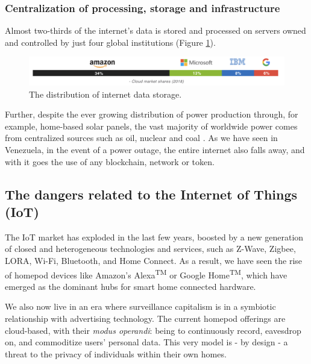 \subsubsection{Centralization of processing, storage and infrastructure}
\label{sec:introdata}
Almost two-thirds of the internet's data is stored and processed on servers owned and controlled by just four global institutions (Figure \ref{fig:internetDist}).

\begin{figure}[h]
	\includegraphics[width=\linewidth, trim= 0cm 0cm 0cm 0cm, clip]{Figures/internetDist.png}
	\caption{The distribution of internet data storage.}
	\label{fig:internetDist}
\end{figure}
Further, despite the ever growing distribution of power production through, for example, home-based solar panels, the vast majority of worldwide power comes from centralized sources such as oil, nuclear and coal \cite{Statista2019}. As we have seen in Venezuela, in the event of a power outage, the entire internet also falls away, and with it goes the use of any blockchain, network or token.

\subsection{The dangers related to the Internet of Things (IoT)}
\label{sec:introiot}
The IoT market has exploded in the last few years, boosted by a new generation of closed and heterogeneous technologies and services, such as Z-Wave, Zigbee, LORA, Wi-Fi, Bluetooth, and Home Connect. As a result, we have seen the rise of homepod devices like Amazon's Alexa\textsuperscript{TM} or Google Home\textsuperscript{TM}, which have emerged as the dominant hubs for smart home connected hardware.

We also now live in an era where surveillance capitalism is in a symbiotic relationship with advertising technology. The current homepod offerings are cloud-based, with their \textit{modus operandi}: being to continuously record, eavesdrop on, and commoditize users' personal data. This very model is - by design - a threat to the privacy of individuals within their own homes.

